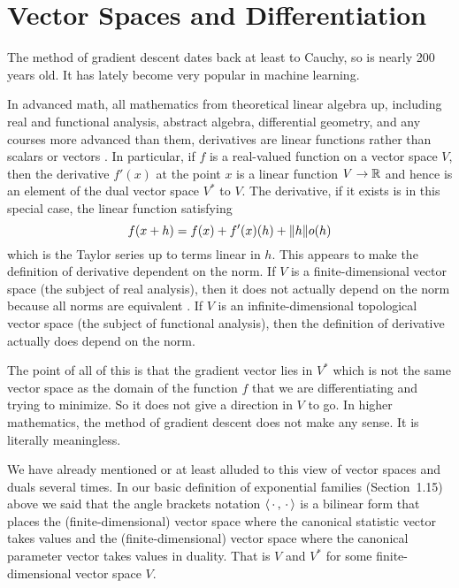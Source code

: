 
\chapter{Vector Spaces and Differentiation}

The method of gradient descent dates back at least to Cauchy, so is
nearly 200 years old.  It has lately become very popular in machine learning.

In advanced math, all mathematics from theoretical linear algebra up,
including real and functional analysis, abstract algebra, differential
geometry, and any courses more advanced than them, derivatives are
linear functions rather than scalars or vectors
\citet[Chapters~XIII and~XXII]{lang}.  In particular, if $f$ is a real-valued
function on a vector space $V$, then the derivative $f'(x)$ at the point $x$
is a linear function $V \to \mathbb{R}$ and hence is an element of the dual vector
space $V^{\textstyle *}$ to $V$.  The derivative, if it exists is in this
special case, the linear function satisfying
$$
   f(x + h) = f(x) + f'(x)(h) + \lVert h \rVert o(h)
$$
which is the Taylor series up to terms linear in $h$.
This appears to make the definition of derivative dependent on the norm.
If $V$ is a finite-dimensional vector space (the subject of real analysis),
then it does not actually depend on the norm because all norms are equivalent
\citep[Corollary~3.14 of Chapter~II]{lang}.
If $V$ is an infinite-dimensional topological vector space
(the subject of functional analysis), then the definition of derivative
actually does depend on the norm.

The point of all of this is that the gradient vector lies in
$V^{\textstyle *}$ which is not the same vector space as the domain of
the function $f$ that we are differentiating and trying to minimize.
So it does not give a direction in $V$ to go.
In higher mathematics, the method of gradient descent does not make any
sense.  It is literally meaningless.

We have already mentioned or at least alluded to this view of vector spaces
and duals several times.  In our basic definition of exponential families
(Section~1.15) above we said that the angle brackets notation
$\langle \,\cdot\,, \,\cdot\, \rangle$ is a bilinear form that places the
(finite-dimensional) vector space where the canonical statistic vector
takes values and the
(finite-dimensional) vector space where the canonical parameter vector
takes values in duality.  That is $V$ and $V^{\textstyle *}$ for some
finite-dimensional vector space $V$.

